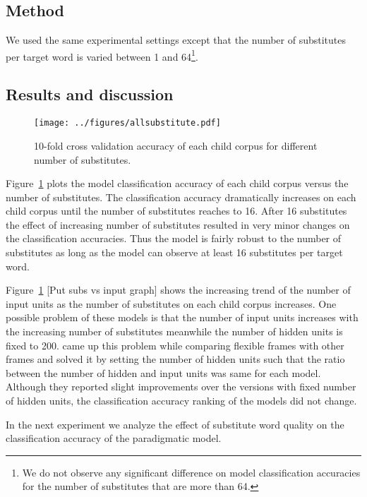 \subsection{Method} 
We used the same experimental settings except that the number of substitutes
per target word is varied between 1 and 64\footnote{We do not observe any
significant difference on model classification accuracies for the number of
substitutes that are more than 64.}.

\subsection{Results and discussion}
\begin{figure}[ht]
  \centering
  \texttt{[image: ../figures/allsubstitute.pdf]}
  \caption{10-fold cross validation accuracy of each child corpus for different
  number of substitutes.}
  \label{fig:substitutes}
\end{figure} 

Figure~\ref{fig:substitutes} plots the model classification accuracy of each
child corpus versus the number of substitutes.  The classification accuracy
dramatically increases on each child corpus until the number of substitutes
reaches to 16.   After 16 substitutes the effect of increasing number of
substitutes resulted in very minor changes on the classification accuracies.
Thus the model is fairly robust to the number of substitutes as long as the
model can observe at least 16 substitutes per target word.  

Figure~\ref{fig:substitutes} [Put subs vs input graph] shows the increasing
trend of the number of input units as the number of substitutes on each child
corpus increases.  One possible problem of these models is that the number of
input units increases with the increasing number of substitutes meanwhile the
number of hidden units is fixed to 200.   \cite{clair2010} came up this problem
while comparing flexible frames with other frames and solved it by setting the
number of hidden units such that the ratio between the number of hidden and
input units was same for each model.  Although they reported slight
improvements over the versions with fixed number of hidden units, the
classification accuracy ranking of the models did not change. 

In the next experiment we analyze the effect of substitute word quality on the
classification accuracy of the paradigmatic model.

